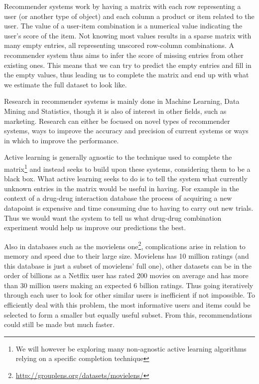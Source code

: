Recommender systems work by having a matrix with each row representing a user (or another type of object) and each column a product or item related to the user. The value of a user-item combination is a numerical value indicating the user's score of the item. Not knowing most values results in a sparse matrix with many empty entries, all representing unscored row-column combinations. A recommender system thus aims to infer the score of missing entries from other existing ones. This means that we can try to predict the empty entries and fill in the empty values, thus leading us to complete the matrix and end up with what we estimate the full dataset to look like.

Research in recommender systems is mainly done in Machine Learning, Data Mining and Statistics, though it is also of interest in other fields, such as marketing. Research can either be focused on novel types of recommender systems, ways to improve the accuracy and precision of current systems or ways in which to improve the performance. 

Active learning is generally agnostic to the technique used to complete the matrix\footnote{We will however be exploring many non-agnostic active learning algorithms relying on a specific completion technique} and instead seeks to build upon these systems, considering them to be a black box. What active learning seeks to do is to tell the system what currently unknown entries in the matrix would be useful in having. For example in the context of a drug-drug interaction database the process of acquiring a new datapoint is expensive and time consuming due to having to carry out new trials. Thus we would want the system to tell us what drug-drug combination experiment would help us improve our predictions the best. 

Also in databases such as the movielens one\footnote{\url{http://grouplens.org/datasets/movielens/}}, complications arise in relation to memory and speed due to their large size. Movielens has 10 million ratings (and this database is just a subset of movielens' full one), other datasets can be in the order of billions as a Netflix user has rated 200 movies on average and has more than 30 million users making an expected 6 billion ratings. Thus going iteratively through each user to look for other similar users is inefficient if not impossible. To efficiently deal with this problem, the most informative users and items could be selected to form a smaller but equally useful subset. From this, recommendations could still be made but much faster. 

